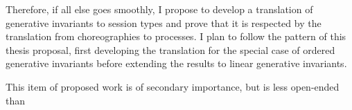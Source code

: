 Therefore, if all else goes smoothly, I propose to develop a translation of generative invariants to session types and prove that it is respected by the translation from choreographies to processes.
I plan to follow the pattern of this thesis proposal, first developing the translation for the special case of ordered generative invariants before extending the results to linear generative invariants.

This item of proposed work is of secondary importance, but is less open-ended than

















